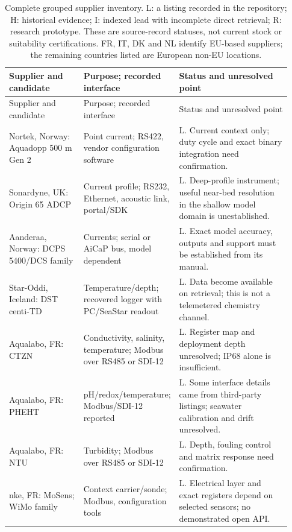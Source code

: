 \begingroup\small
\setlength{\tabcolsep}{4pt}
\begin{longtable}{p{0.28\linewidth}p{0.22\linewidth}p{0.43\linewidth}}
\caption{Complete grouped supplier inventory. L: a listing recorded in the repository; H: historical evidence; I: indexed lead with incomplete direct retrieval; R: research prototype. These are source-record statuses, not current stock or suitability certifications. FR, IT, DK and NL identify EU-based suppliers; the remaining countries listed are European non-EU locations.}\label{tab:suppliers}\\
\toprule
Supplier and candidate & Purpose; recorded interface & Status and unresolved point \\
\midrule
\endfirsthead
\toprule
Supplier and candidate & Purpose; recorded interface & Status and unresolved point \\
\midrule
\endhead
\bottomrule
\endfoot
Nortek, Norway: Aquadopp 500 m Gen 2 & Point current; RS422, vendor configuration software & L. Current context only; duty cycle and exact binary integration need confirmation. \\
Sonardyne, UK: Origin 65 ADCP & Current profile; RS232, Ethernet, acoustic link, portal/SDK & L. Deep-profile instrument; useful near-bed resolution in the shallow model domain is unestablished. \\
Aanderaa, Norway: DCPS 5400/DCS family & Currents; serial or AiCaP bus, model dependent & L. Exact model accuracy, outputs and support must be established from its manual. \\
Star-Oddi, Iceland: DST centi-TD & Temperature/depth; recovered logger with PC/SeaStar readout & L. Data become available on retrieval; this is not a telemetered chemistry channel. \\
Aqualabo, FR: CTZN & Conductivity, salinity, temperature; Modbus over RS485 or SDI-12 & L. Register map and deployment depth unresolved; IP68 alone is insufficient. \\
Aqualabo, FR: PHEHT & pH/redox/temperature; Modbus/SDI-12 reported & L. Some interface details came from third-party listings; seawater calibration and drift unresolved. \\
Aqualabo, FR: NTU & Turbidity; Modbus over RS485 or SDI-12 & L. Depth, fouling control and matrix response need confirmation. \\
nke, FR: MoSens; WiMo family & Context carrier/sonde; Modbus, configuration tools & L. Electrical layer and exact registers depend on selected sensors; no demonstrated open API. \\

\end{longtable}

